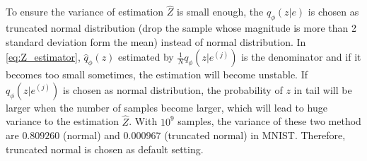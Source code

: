 To ensure the variance of estimation $\hat{Z}$ is small enough, the $q_\phi(z|e)$ is chosen as truncated normal distribution (drop the sample whose magnitude is more than 2 standard deviation form the mean) instead of normal distribution. In \cref{eq:Z_estimator}, $\hat{q}_\phi(z)$ estimated by $\frac{1}{N}q_\phi(z|e^{(j)})$ is the denominator and if it becomes too small sometimes, the estimation will become unstable. If $q_\phi(z|e^{(j)})$ is chosen as normal distribution, the probability of $z$ in tail will be larger when the number of samples become larger, which will lead to huge variance to the estimation $\hat{Z}$. With $10^9$ samples, the variance of these two method are $0.809260$ (normal) and $0.000967$ (truncated normal) in MNIST. Therefore, truncated normal is chosen as default setting. 


